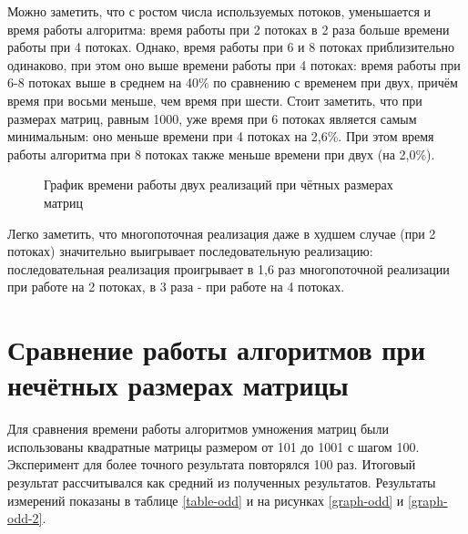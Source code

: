 \documentclass[12pt, a4paper]{report}
\begin{document}
	Можно заметить, что с ростом числа используемых потоков, уменьшается и время работы алгоритма: время работы при 2 потоках в 2 раза больше времени работы при 4 потоках. Однако, время работы при 6 и 8 потоках приблизительно одинаково, при этом оно выше времени работы при 4 потоках: время работы при 6-8 потоках выше в среднем на 40\% по сравнению с временем при двух, причём время при восьми меньше, чем время при шести.
	Стоит заметить, что при размерах матриц, равным 1000, уже время при 6 потоках является самым минимальным: оно меньше времени при 4 потоках на 2,6\%. При этом время работы алгоритма при 8 потоках также меньше времени при двух (на 2,0\%).
	
	\begin{figure}[ht!]
		\caption{График времени работы двух реализаций при чётных размерах матриц}
		\label{graph-even-2}
	\end{figure}
	
	Легко заметить, что многопоточная реализация даже в худшем случае (при 2 потоках) значительно выигрывает последовательную реализацию: последовательная реализация проигрывает в 1,6 раз многопоточной реализации при работе на 2 потоках, в 3 раза - при работе на 4 потоках.
	
	\section{Сравнение работы алгоритмов при нечётных размерах матрицы}
	Для сравнения времени работы алгоритмов умножения матриц были использованы квадратные матрицы размером от 101 до 1001 с шагом 100. Эксперимент для более точного результата повторялся 100 раз. Итоговый результат рассчитывался как средний из полученных результатов. Результаты измерений показаны в таблице \ref{table-odd} и на рисунках \ref{graph-odd} и \ref{graph-odd-2}.\\
	
\end{document}
